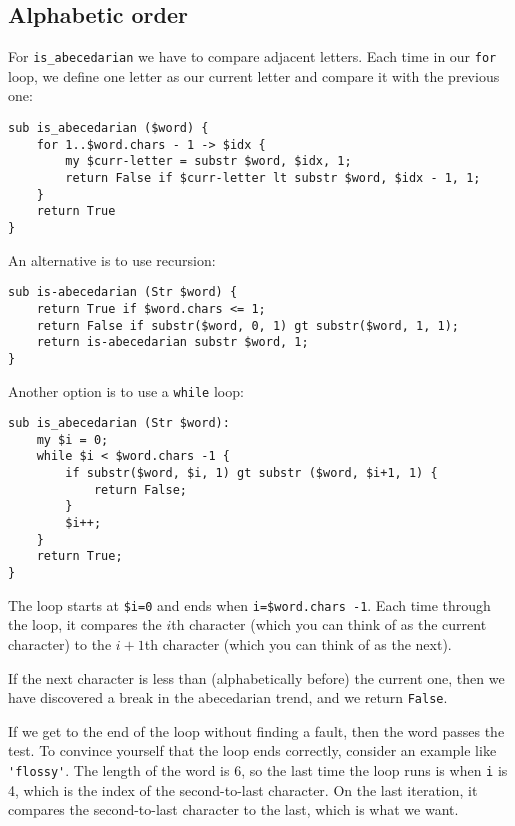 \subsection{Alphabetic order}

For \verb"is_abecedarian" we have to compare adjacent letters. 
Each time in our {\tt for} loop, we define one letter as our 
current letter and compare it with the previous one:

\begin{verbatim}
sub is_abecedarian ($word) {
    for 1..$word.chars - 1 -> $idx {    
        my $curr-letter = substr $word, $idx, 1;
        return False if $curr-letter lt substr $word, $idx - 1, 1;  
    }     
    return True
}
\end{verbatim}

An alternative is to use recursion:

\begin{verbatim}
sub is-abecedarian (Str $word) {
    return True if $word.chars <= 1;
    return False if substr($word, 0, 1) gt substr($word, 1, 1);
    return is-abecedarian substr $word, 1;
}
\end{verbatim}

Another option is to use a {\tt while} loop:

\begin{verbatim}
sub is_abecedarian (Str $word):
    my $i = 0;
    while $i < $word.chars -1 {
        if substr($word, $i, 1) gt substr ($word, $i+1, 1) {
            return False;
        }
        $i++;
    }
    return True;
}
\end{verbatim}
%
The loop starts at {\tt \$i=0} and ends when {\tt i=\$word.chars -1}.  Each
time through the loop, it compares the $i$th character (which you can
think of as the current character) to the $i+1$th character (which you
can think of as the next).

If the next character is less than (alphabetically before) the current
one, then we have discovered a break in the abecedarian trend, and
we return {\tt False}.

If we get to the end of the loop without finding a fault, then the
word passes the test.  To convince yourself that the loop ends
correctly, consider an example like \verb"'flossy'".  The
length of the word is 6, so
the last time the loop runs is when {\tt i} is 4, which is the
index of the second-to-last character.  On the last iteration,
it compares the second-to-last character to the last, which is
what we want.

